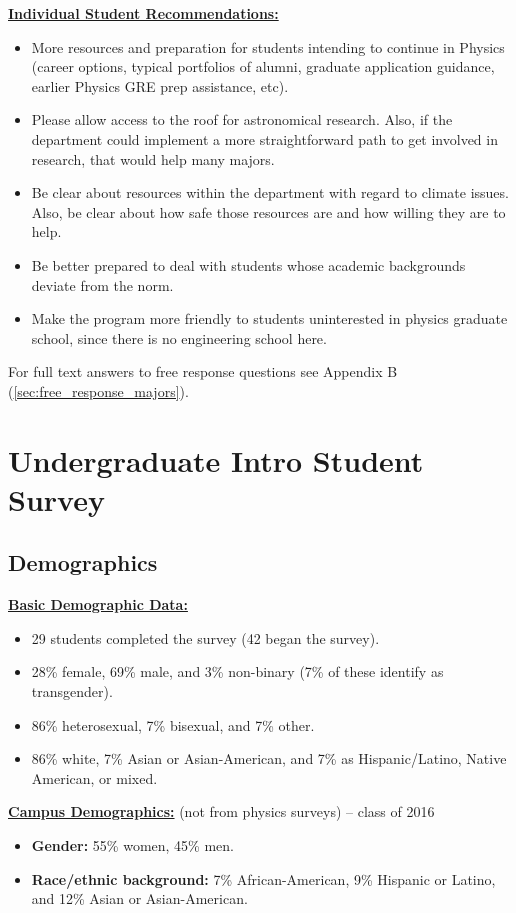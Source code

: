 \documentclass[oneside]{book}   %
\begin{document}
\noindent\underline{\textbf{Individual Student Recommendations:}}
\begin{itemize}
	\item More resources and preparation for students intending to continue in Physics (career options, typical portfolios of alumni, graduate application guidance, earlier Physics GRE prep assistance, etc).
	\item Please allow access to the roof for astronomical research. Also, if the department could implement a more straightforward path to get involved in research, that would help many majors.
	\item Be clear about resources within the department with regard to climate issues. Also, be clear about how safe those resources are and how willing they are to help.
	\item Be better prepared to deal with students whose academic backgrounds deviate from the norm.
	\item Make the program more friendly to students uninterested in physics graduate school, since there is no engineering school here.
\end{itemize}

For full text answers to free response questions see Appendix B (\cref{sec:free_response_majors}).

\chapter{Undergraduate Intro Student Survey}
\label{ch:intro}
\section{Demographics}
\noindent\underline{\textbf{Basic Demographic Data:}}
\begin{itemize}
	\item 29 students completed the survey (42 began the survey).
	\item 28\% female, 69\% male, and 3\% non-binary (7\% of these identify as transgender).
	\item 86\% heterosexual, 7\% bisexual, and 7\% other.
	\item 86\% white, 7\% Asian or Asian-American, and 7\% as Hispanic/Latino, Native American, or mixed.
\end{itemize}

\noindent\underline{\textbf{Campus Demographics:}} (not from physics surveys) – class of 2016
\begin{itemize}
	\item \textbf{Gender:} 55\% women, 45\% men.
	\item \textbf{Race/ethnic background:} 7\% African-American, 9\% Hispanic or Latino, and 12\% Asian or Asian-American.
\end{itemize}
\end{document}
